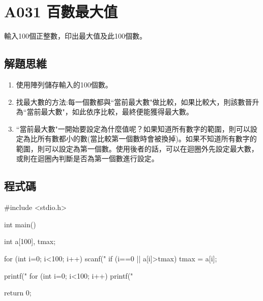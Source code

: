 \section{A031 百數最大值}
輸入100個正整數，印出最大值及此100個數。

\subsection{解題思維}

\begin{enumerate}
	\item 使用陣列儲存輸入的100個數。
	\item 找最大數的方法:每一個數都與``當前最大數"做比較，如果比較大，則該數晉升為``當前最大數"，如此依序比較，最終便能獲得最大數。
	\item ``當前最大數"一開始要設定為什麼值呢？如果知道所有數字的範圍，則可以設定為比所有數都小的數(當比較第一個數時會被換掉)。如果不知道所有數字的範圍，則可以設定為第一個數。使用後者的話，可以在迴圈外先設定最大數，或則在迴圈內判斷是否為第一個數進行設定。
\end{enumerate} 

\subsection{程式碼}
\begin{cppcode}
	#include <stdio.h>
	
	int main()
	{
		int a[100], tmax;
		
		for (int i=0; i<100; i++) {
			scanf("%
			if (i==0 || a[i]>tmax) tmax = a[i];
		}
		
		printf("%
		for (int i=0; i<100; i++) printf("%
		
		return 0;
	}
		
\end{cppcode}
